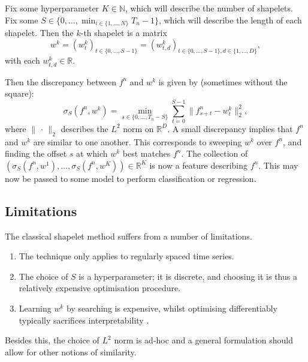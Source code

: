 \documentclass{article}
\theoremstyle{plain}
\theoremstyle{definition}
\newcommand{\reals}{\mathbb{R}}
\newcommand{\naturals}{\mathbb{N}}
\newcommand{\norm}[1]{\|#1\|}
\begin{document}
	Fix some hyperparameter $K \in \naturals$, which will describe the number of shapelets. Fix some $S \in \{0, \ldots, \min_{i \in \{1, \ldots, N\}}T_n - 1\}$, which will describe the length of each shapelet. Then the $k$-th shapelet is a matrix
	\begin{equation*}
	w^{k} = (w^{k}_t)_{t \in \{0, \ldots, S - 1\}} = (w^{k}_{t, d})_{t \in \{0, \ldots, S - 1\}, d \in \{1, \ldots, D\}},
	\end{equation*}
	with each $w^{k}_{t, d} \in \reals$.
	
	Then the discrepancy between $f^n$ and $w^{k}$ is given by (sometimes without the square):
	\begin{equation}\label{eq:classical-shapelets}
	\sigma_S(f^n, w^{k}) = \min_{s \in \{0, \ldots, T_n - S\}} \sum_{t = 0}^{S - 1} \norm{f^n_{s + t} - w^{k}_t}_2^2,
	\end{equation}
	where $\norm{\,\cdot\,}_2$ describes the $L^2$ norm on $\reals^D$. A small discrepancy implies that $f^n$ and $w^{k}$ are similar to one another. This corresponds to sweeping $w^{k}$ over $f^n$, and finding the offset $s$ at which $w^{k}$ best matches $f^n$. The collection of $(\sigma_S(f^n, w^{1}), \ldots, \sigma_S(f^n, w^{K})) \in \reals^K$ is now a feature describing $f^n$. This may now be passed to some model to perform classification or regression.
	
	\subsection{Limitations}
	The classical shapelet method suffers from a number of limitations.
	\begin{enumerate}
	\item The technique only applies to regularly spaced time series.
	\item The choice of $S$ is a hyperparameter; it is discrete, and choosing it is thus a relatively expensive optimisation procedure.
	\item Learning $w^{k}$ by searching \cite{ye2009firstshapelet} is expensive, whilst optimising differentiably \cite{grabocka2014learningshapelet} typically sacrifices interpretability \cite{wang2019interp}.
	\end{enumerate}
	Besides this, the choice of $L^2$ norm is ad-hoc and a general formulation should allow for other notions of similarity.
	
\end{document}
